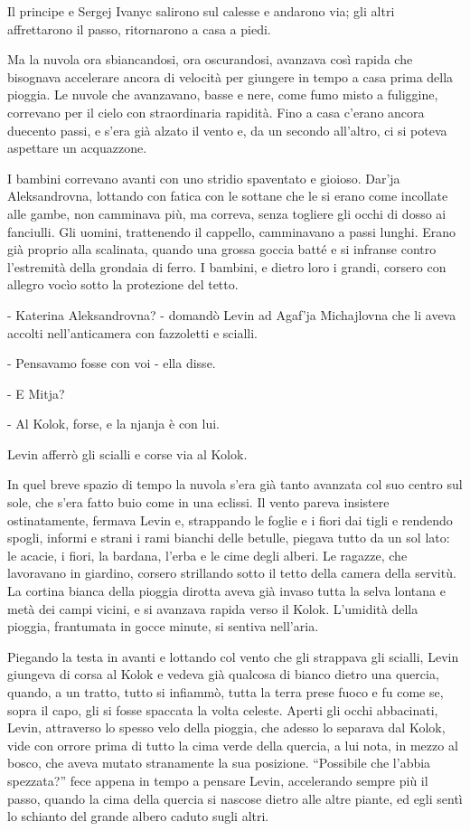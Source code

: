 \label{xvii-7} 

Il principe e Sergej Ivanyc salirono sul calesse e andarono via; gli altri affrettarono il passo, ritornarono a casa a piedi. 

Ma la nuvola ora sbiancandosi, ora oscurandosi, avanzava così rapida che bisognava accelerare ancora di velocità per giungere in tempo a casa prima della pioggia. Le nuvole che avanzavano, basse e nere, come fumo misto a fuliggine, correvano per il cielo con straordinaria rapidità. Fino a casa c'erano ancora duecento passi, e s'era già alzato il vento e, da un secondo all'altro, ci si poteva aspettare un acquazzone. 

I bambini correvano avanti con uno stridio spaventato e gioioso. Dar'ja Aleksandrovna, lottando con fatica con le sottane che le si erano come incollate alle gambe, non camminava più, ma correva, senza togliere gli occhi di dosso ai fanciulli. Gli uomini, trattenendo il cappello, camminavano a passi lunghi. Erano già proprio alla scalinata, quando una grossa goccia batté e si infranse contro l'estremità della grondaia di ferro. I bambini, e dietro loro i grandi, corsero con allegro vocìo sotto la protezione del tetto. 

- Katerina Aleksandrovna? - domandò Levin ad Agaf'ja Michajlovna che li aveva accolti nell'anticamera con fazzoletti e scialli. 

- Pensavamo fosse con voi - ella disse. 

- E Mitja? 

- Al Kolok, forse, e la njanja è con lui. 

Levin afferrò gli scialli e corse via al Kolok. 

In quel breve spazio di tempo la nuvola s'era già tanto avanzata col suo centro sul sole, che s'era fatto buio come in una eclissi. Il vento pareva insistere ostinatamente, fermava Levin e, strappando le foglie e i fiori dai tigli e rendendo spogli, informi e strani i rami bianchi delle betulle, piegava tutto da un sol lato: le acacie, i fiori, la bardana, l'erba e le cime degli alberi. Le ragazze, che lavoravano in giardino, corsero strillando sotto il tetto della camera della servitù. La cortina bianca della pioggia dirotta aveva già invaso tutta la selva lontana e metà dei campi vicini, e si avanzava rapida verso il Kolok. L'umidità della pioggia, frantumata in gocce minute, si sentiva nell'aria. 

Piegando la testa in avanti e lottando col vento che gli strappava gli scialli, Levin giungeva di corsa al Kolok e vedeva già qualcosa di bianco dietro una quercia, quando, a un tratto, tutto si infiammò, tutta la terra prese fuoco e fu come se, sopra il capo, gli si fosse spaccata la volta celeste. Aperti gli occhi abbacinati, Levin, attraverso lo spesso velo della pioggia, che adesso lo separava dal Kolok, vide con orrore prima di tutto la cima verde della quercia, a lui nota, in mezzo al bosco, che aveva mutato stranamente la sua posizione. ``Possibile che l'abbia spezzata?'' fece appena in tempo a pensare Levin, accelerando sempre più il passo, quando la cima della quercia si nascose dietro alle altre piante, ed egli sentì lo schianto del grande albero caduto sugli altri. 

